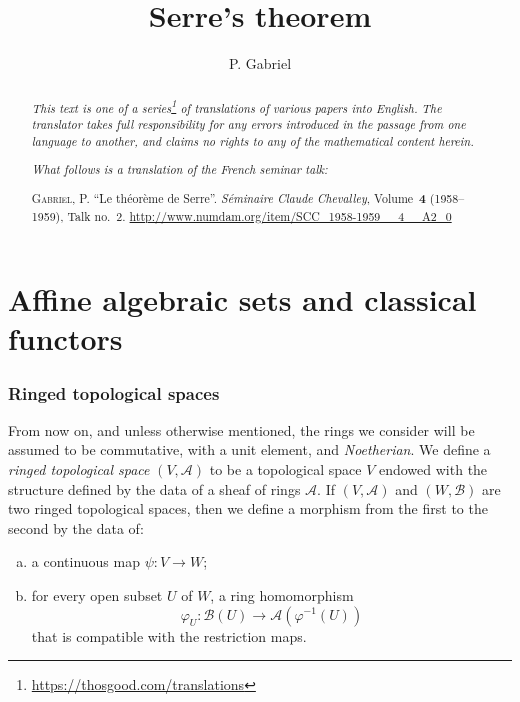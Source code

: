 \documentclass{article}
\title{Serre's theorem}
\author{P. Gabriel}
\date{}
\newcommand{\doctype}{French seminar talk}
\newcommand{\origcit}{%
  \textsc{Gabriel, P.}
  ``Le th\'{e}or\`{e}me de Serre''.
  \emph{S\'{e}minaire Claude Chevalley}, Volume~\textbf{4} (1958--1959), Talk no.~2.
  {\url{http://www.numdam.org/item/SCC_1958-1959__4__A2_0}}%
}
\theoremstyle{plain}
\newcommand{\scr}[1]{{\mathscr{#1}}}
\newcommand{\oldpage}[1]{\marginpar{\footnotesize$\Big\vert$ \textit{p.~#1}}}
\begin{document}
\maketitle
\thispagestyle{fancy}

\renewcommand{\abstractname}{Translator's note.}

\begin{abstract}
  \renewcommand*{\thefootnote}{\fnsymbol{footnote}}
  \emph{This text is one of a series\footnote{\url{https://thosgood.com/translations}} of translations of various papers into English.}
  \emph{The translator takes full responsibility for any errors introduced in the passage from one language to another, and claims no rights to any of the mathematical content herein.}

  \medskip
  
  \emph{What follows is a translation of the \doctype:}

  \medskip\noindent
  \origcit
\end{abstract}

\setcounter{footnote}{0}

\tableofcontents
\bigskip



\part{Affine algebraic sets and classical functors}
\label{chapterA}


\section{Ringed topological spaces}
\label{section1}

\oldpage{2-01}

From now on, and unless otherwise mentioned, the rings we consider will be assumed to be commutative, with a unit element, and \emph{Noetherian}.
We define a \emph{ringed topological space} $(V,\scr{A})$ to be a topological space $V$ endowed with the structure defined by the data of a sheaf of rings $\scr{A}$.
If $(V,\scr{A})$ and $(W,\scr{B})$ are two ringed topological spaces, then we define a morphism from the first to the second by the data of:
\begin{enumerate}[(a)]
  \item a continuous map $\psi\colon V\to W$;
  \item for every open subset $U$ of $W$, a ring homomorphism
    \[
      \varphi_U\colon\scr{B}(U)\to\scr{A}(\varphi^{-1}(U))
    \]
    that is compatible with the restriction maps.
\end{enumerate}
\end{document}
